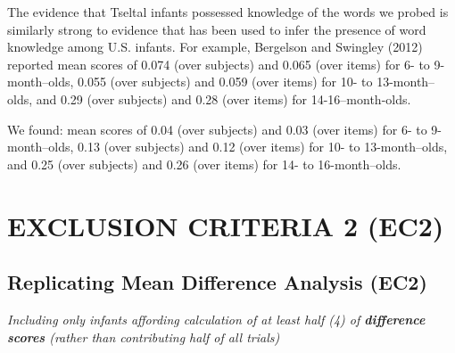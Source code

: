 \documentclass[
  doc,floatsintext]{apa6}
\newenvironment{Shaded}{\begin{snugshade}}{\end{snugshade}}
\newcommand{\NormalTok}[1]{#1}
\newcommand{\OtherTok}[1]{\textcolor[rgb]{0.56,0.35,0.01}{#1}}
\newcommand{\SpecialCharTok}[1]{\textcolor[rgb]{0.81,0.36,0.00}{\textbf{#1}}}
\newcommand{\StringTok}[1]{\textcolor[rgb]{0.31,0.60,0.02}{#1}}
\begin{document}
\begin{Shaded}
\end{Shaded}

The evidence that Tseltal infants possessed knowledge of the words we probed is similarly strong to evidence that has been used to infer the presence of word knowledge among U.S. infants. For example, Bergelson and Swingley (2012) reported mean scores of 0.074 (over subjects) and 0.065 (over items) for 6- to 9-month--olds, 0.055 (over subjects) and 0.059 (over items) for 10- to 13-month--olds, and 0.29 (over subjects) and 0.28 (over items) for 14-16--month-olds.

We found: mean scores of 0.04 (over subjects) and 0.03 (over items) for 6- to 9-month--olds, 0.13 (over subjects) and 0.12 (over items) for 10- to 13-month--olds, and 0.25 (over subjects) and 0.26 (over items) for 14- to 16-month--olds.

\section{EXCLUSION CRITERIA 2 (EC2)}\label{exclusion-criteria-2-ec2}

\subsection{Replicating Mean Difference Analysis (EC2)}\label{replicating-mean-difference-analysis-ec2}

\emph{Including only infants affording calculation of at least half (4) of \textbf{difference scores} (rather than contributing half of all trials)}
\end{document}
